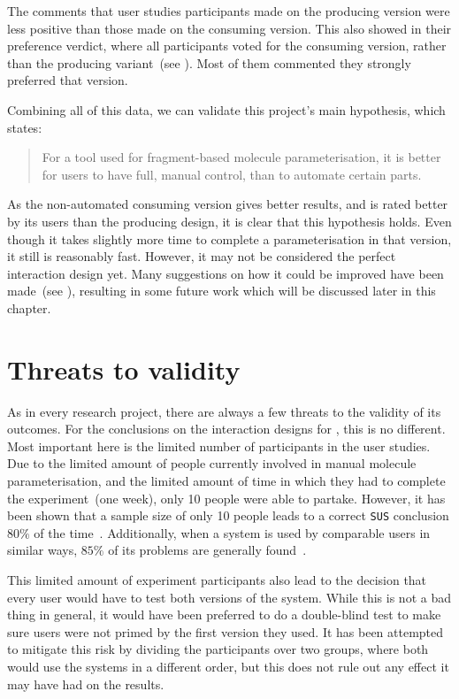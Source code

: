 The comments that user studies participants made on the producing version were less positive than those made on the consuming version. This also showed in their preference verdict, where all participants voted for the consuming version, rather than the producing variant~(see ). Most of them commented they strongly preferred that version.

Combining all of this data, we can validate this project's main hypothesis, which states:
\begin{quote}
For a tool used for fragment-based molecule parameterisation, it is better for users to have full, manual control, than to automate certain parts.
\end{quote}
As the non-automated consuming version gives better results, and is rated better by its users than the producing design, it is clear that this hypothesis holds. Even though it takes slightly more time to complete a parameterisation in that version, it still is reasonably fast. However, it may not be considered the perfect interaction design yet. Many suggestions on how it could be improved have been made~(see ), resulting in some future work which will be discussed later in this chapter.



\section{Threats to validity}
As in every research project, there are always a few threats to the validity of its outcomes. For the conclusions on the interaction designs for \oframp, this is no different. Most important here is the limited number of participants in the user studies. Due to the limited amount of people currently involved in manual molecule parameterisation, and the limited amount of time in which they had to complete the experiment~(one week), only 10 people were able to partake. However, it has been shown that a sample size of only 10 people leads to a correct \verb|SUS| conclusion $80\%$ of the time~\cite{tullis2004comparison}. Additionally, when a system is used by comparable users in similar ways, $85\%$ of its problems are generally found~\cite{nielsen2000you}.

This limited amount of experiment participants also lead to the decision that every user would have to test both versions of the system. While this is not a bad thing in general, it would have been preferred to do a double-blind test to make sure users were not primed by the first version they used. It has been attempted to mitigate this risk by dividing the participants over two groups, where both would use the systems in a different order, but this does not rule out any effect it may have had on the results.

